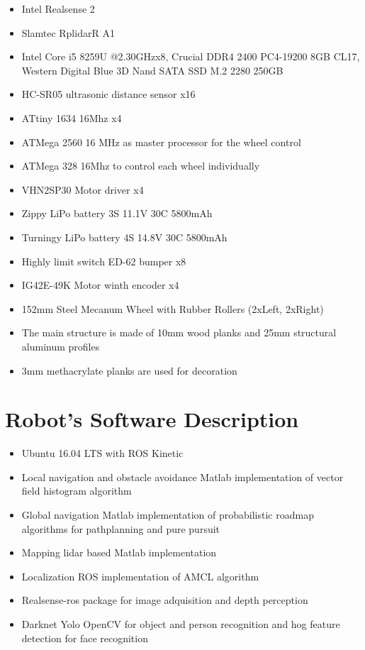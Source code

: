 \begin{itemize}[nosep]
	\item Intel Realsense 2
  \item Slamtec RplidarR A1 
  \item Intel Core i5 8259U @2.30GHzx8, Crucial DDR4 2400 PC4-19200 8GB CL17, Western Digital Blue 3D Nand SATA SSD M.2 2280 250GB
  \item HC-SR05 ultrasonic distance sensor x16
  \item ATtiny 1634 16Mhz x4
  \item ATMega 2560 16 MHz as master processor for the wheel control
  \item ATMega 328 16Mhz to control each wheel individually
  \item VHN2SP30 Motor driver x4
  \item Zippy LiPo battery 3S 11.1V 30C 5800mAh 
  \item Turningy LiPo battery 4S 14.8V 30C 5800mAh 
  \item Highly limit switch ED-62 bumper x8
  \item IG42E-49K Motor winth encoder x4
  \item 152mm Steel Mecanum Wheel with Rubber Rollers (2xLeft, 2xRight)
  \item The main structure is made of 10mm wood planks and 25mm structural aluminum profiles
  \item 3mm methacrylate planks are used for decoration


\end{itemize}

\section*{Robot's Software Description}

\begin{itemize}[nosep]
	\item Ubuntu 16.04 LTS with ROS Kinetic
  \item Local navigation and obstacle avoidance Matlab implementation of vector field histogram algorithm
  \item Global navigation Matlab implementation of probabilistic roadmap algorithms for pathplanning and pure pursuit
  \item Mapping lidar based Matlab implementation
  \item Localization ROS implementation of AMCL algorithm
  \item Realsense-ros package for image adquisition and depth perception
  \item Darknet Yolo OpenCV for object and person recognition and hog feature detection for face recognition
\end{itemize}


